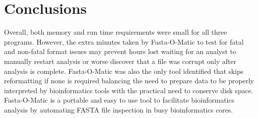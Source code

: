 \section{Conclusions}
Overall, both memory and run time requirements were small for all three programs. However, the extra minutes taken by Fasta-O-Matic to test for fatal and non-fatal format issues may prevent hours lost waiting for an analyst to manually restart analysis or worse discover that a file was corrupt only after analysis is complete. Fasta-O-Matic was also the only tool identified that skips reformatting if none is required balancing the need to prepare data to be properly interpreted by bioinformatics tools with the practical need to conserve disk space. Fasta-O-Matic is a portable and easy to use tool to facilitate bioinformatics analysis by automating FASTA file inspection in busy bioinformatics cores.
  
  